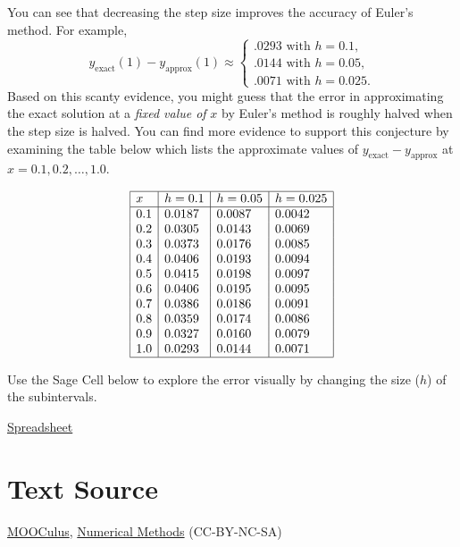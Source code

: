 \documentclass{ximera}
\begin{document}
\begin{example}
\begin{explanation}
You can see that decreasing the step size
improves the accuracy of Euler's method. For example,
$$
y_{\text{exact}}(1)-y_{\text{approx}}(1)\approx
\left\{\begin{array}{l}
.0293\text{ with }h=0.1,\\
.0144\text{ with }h=0.05,\\
.0071\text{ with }h=0.025.
\end{array}\right.
$$
Based on this scanty evidence, you might guess that the error in
approximating the exact solution at a \textit{fixed value of} $x$ by
Euler's method is roughly halved when the step size is halved. You can
find more evidence to support this conjecture by examining
the table below which lists the approximate values of
$y_{\text{exact}}-y_{\text{approx}}$ at
$x=0.1, 0.2, \dots, 1.0$.

$$
\begin{array}{|l|l|l|l|}
\hline
x & h=0.1 & h=0.05 & h=0.025\\ \hline
0.1 & 0.0187 & 0.0087 & 0.0042\\
0.2 & 0.0305 & 0.0143 & 0.0069\\
0.3 & 0.0373 & 0.0176 & 0.0085\\
0.4 & 0.0406 & 0.0193 & 0.0094\\
0.5 & 0.0415 & 0.0198 & 0.0097\\
0.6 & 0.0406 & 0.0195 & 0.0095\\
0.7 & 0.0386 & 0.0186 & 0.0091\\
0.8 & 0.0359 & 0.0174 & 0.0086\\
0.9 & 0.0327 & 0.0160 & 0.0079\\
1.0 & 0.0293 & 0.0144 & 0.0071\\
\hline
\end{array}
$$

Use the Sage Cell below to explore the error visually by changing the size ($h$) of the subintervals.

%
%
%

\href{https://docs.google.com/spreadsheets/d/1aE9Nh2VZpG2zJI70yeJpjNZDdxxaqFA8qwoZakjrK-M/edit?usp=sharing}{Spreadsheet}%

\end{explanation}
\end{example}







\section*{Text Source}
\href{https://github.com/mooculus/calculus}{MOOCulus},
\href{https://github.com/mooculus/calculus/blob/a5d5bc54f341b1f3224dde40168188e81032ef65/differentialEquations/digInDifferentialEquations.tex#L1}{Numerical Methods} (CC-BY-NC-SA)
\end{document}
